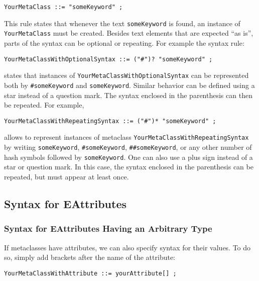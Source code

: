 \lstset{language=CS}
\begin{lstlisting}
YourMetaClass ::= "someKeyword" ;
\end{lstlisting}

This rule states that whenever the text \texttt{someKeyword} is found, an
instance of \texttt{YourMetaClass} must be created. Besides text elements that are
expected ``as is'', parts of the syntax can be optional or repeating. For
example the syntax rule:

\lstset{language=CS}
\begin{lstlisting}
YourMetaClassWithOptionalSyntax ::= ("#")? "someKeyword" ;
\end{lstlisting}

states that instances of \texttt{YourMetaClassWithOptionalSyntax} can be
represented both by \texttt{\#someKeyword} and \texttt{someKeyword}. Similar
behavior can be defined using a star instead of a question mark. The syntax 
enclosed in the parenthesis can then be repeated. For example,

\lstset{language=CS}
\begin{lstlisting}
YourMetaClassWithRepeatingSyntax ::= ("#")* "someKeyword" ;
\end{lstlisting}

allows to represent instances of metaclass
\texttt{YourMetaClassWithRepeatingSyntax} by writing \texttt{someKeyword},
\texttt{\#someKeyword}, \texttt{\#\#someKeyword}, or any other number of hash
symbols followed by \texttt{someKeyword}.
One can also use a plus sign instead of a star or question mark. In this case,
the syntax enclosed in the parenthesis can be repeated, but must appear at least
once.

\subsection{Syntax for EAttributes}

\subsubsection{Syntax for EAttributes Having an Arbitrary Type}

If metaclasses have attributes, we can also specify syntax for their values. 
To do so, simply add brackets after the name of the attribute:

\lstset{language=CS}
\begin{lstlisting}
YourMetaClassWithAttribute ::= yourAttribute[] ;
\end{lstlisting}

